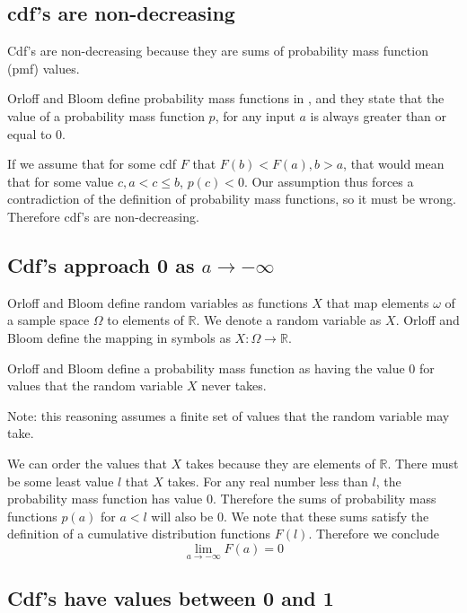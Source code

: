 \documentclass[a4paper,11pt]{article}
\begin{document}
\subsection{cdf's are non-decreasing}

Cdf's are non-decreasing because they are sums of probability mass
function (pmf) values.

Orloff and Bloom define probability mass functions in \cite{reading4}, 
and they state that the value of a probability mass function $p$,
for any input $a$ is always greater than or equal to 0.

If we assume that for some cdf $F$ that $F \left( b \right) <
F \left(a \right), b > a$, that would mean that for some value
$c, a < c \leq b$, $p\left( c \right) < 0$.  Our assumption thus
forces a contradiction of the definition of probability mass functions,
so it must be wrong.  Therefore cdf's are non-decreasing.

\subsection{Cdf's approach 0 as $a \rightarrow -\infty$}

Orloff and Bloom define random variables as functions $X$ that
map elements $\omega$ of a sample space $\Omega$ to elements of
$\mathbb{R}$. We denote a random variable as $X$.  Orloff and Bloom
define the mapping in symbols as $X : \Omega \rightarrow \mathbb{R}$.

Orloff and Bloom define a probability mass function as having the
value 0 for values that the random variable $X$ never takes.

Note: this reasoning assumes a finite set of values that the random
variable may take.

We can order the values that $X$ takes because they are elements of
$\mathbb{R}$.  There must be some  least value $l$ that $X$ takes.
For any real number less than $l$, the probability mass function
has value $0$.  Therefore the sums of probability mass functions 
$p\left( a \right)$ for $a < l$ will also be $0$.  We note that
these sums satisfy the definition of a cumulative distribution functions
$F \left( l \right)$. Therefore we conclude
\begin{equation}
  \lim_{a \rightarrow -\infty} F \left( a \right) = 0
\end{equation}



\subsection{Cdf's have values between 0 and 1}
\end{document}
